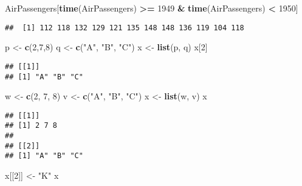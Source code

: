 \documentclass[]{article}
\newenvironment{Shaded}{\begin{snugshade}}{\end{snugshade}}
\newcommand{\KeywordTok}[1]{\textcolor[rgb]{0.13,0.29,0.53}{\textbf{#1}}}
\newcommand{\DecValTok}[1]{\textcolor[rgb]{0.00,0.00,0.81}{#1}}
\newcommand{\StringTok}[1]{\textcolor[rgb]{0.31,0.60,0.02}{#1}}
\newcommand{\OperatorTok}[1]{\textcolor[rgb]{0.81,0.36,0.00}{\textbf{#1}}}
\newcommand{\NormalTok}[1]{#1}
\begin{document}
\begin{Shaded}
\begin{Highlighting}[]
\NormalTok{AirPassengers[}\KeywordTok{time}\NormalTok{(AirPassengers) }\OperatorTok{>=}\StringTok{ }\DecValTok{1949} \OperatorTok{&}\StringTok{ }\KeywordTok{time}\NormalTok{(AirPassengers) }\OperatorTok{<}\StringTok{ }\DecValTok{1950}\NormalTok{]}
\end{Highlighting}
\end{Shaded}

\begin{verbatim}
##  [1] 112 118 132 129 121 135 148 148 136 119 104 118
\end{verbatim}

\begin{Shaded}
\begin{Highlighting}[]
\NormalTok{p <-}\StringTok{ }\KeywordTok{c}\NormalTok{(}\DecValTok{2}\NormalTok{,}\DecValTok{7}\NormalTok{,}\DecValTok{8}\NormalTok{)}
\NormalTok{q <-}\StringTok{ }\KeywordTok{c}\NormalTok{(}\StringTok{"A"}\NormalTok{, }\StringTok{"B"}\NormalTok{, }\StringTok{"C"}\NormalTok{)}
\NormalTok{x <-}\StringTok{ }\KeywordTok{list}\NormalTok{(p, q)}
\NormalTok{x[}\DecValTok{2}\NormalTok{]}
\end{Highlighting}
\end{Shaded}

\begin{verbatim}
## [[1]]
## [1] "A" "B" "C"
\end{verbatim}

\begin{Shaded}
\begin{Highlighting}[]
\NormalTok{w <-}\StringTok{ }\KeywordTok{c}\NormalTok{(}\DecValTok{2}\NormalTok{, }\DecValTok{7}\NormalTok{, }\DecValTok{8}\NormalTok{)}
\NormalTok{v <-}\StringTok{ }\KeywordTok{c}\NormalTok{(}\StringTok{"A"}\NormalTok{, }\StringTok{"B"}\NormalTok{, }\StringTok{"C"}\NormalTok{)}
\NormalTok{x <-}\StringTok{ }\KeywordTok{list}\NormalTok{(w, v)}
\NormalTok{x}
\end{Highlighting}
\end{Shaded}

\begin{verbatim}
## [[1]]
## [1] 2 7 8
## 
## [[2]]
## [1] "A" "B" "C"
\end{verbatim}

\begin{Shaded}
\begin{Highlighting}[]
\NormalTok{x[[}\DecValTok{2}\NormalTok{]] <-}\StringTok{ "K"} 
\NormalTok{x}
\end{Highlighting}
\end{Shaded}
\end{document}
